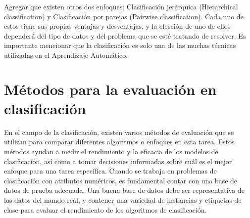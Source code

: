 Agregar que existen otros dos enfoques: Clasificación jerárquica (Hierarchical classification) y Clasificación por parejas (Pairwise classification). Cada uno de estos tiene sus propias ventajas y desventajas, y la elección de uno de ellos dependerá del tipo de datos y del problema que se esté tratando de resolver. Es importante mencionar que la clasificación es solo una de las muchas técnicas utilizadas en el Aprendizaje  Automático. 

\section{Métodos para la evaluación en clasificación}
En el campo de la clasificación, existen varios métodos de evaluación que se utilizan para comparar diferentes algoritmos o enfoques en esta tarea. Estos métodos ayudan a medir el rendimiento y la eficacia de los modelos de clasificación, así como a tomar decisiones informadas sobre cuál es el mejor enfoque para una tarea específica. Cuando se trabaja en problemas de clasificación con atributos numéricos, es fundamental contar con una base de datos de prueba adecuada. Una buena base de datos debe ser representativa de los datos del mundo real, y contener una variedad de instancias y etiquetas de clase para evaluar el rendimiento de los algoritmos de clasificación.

